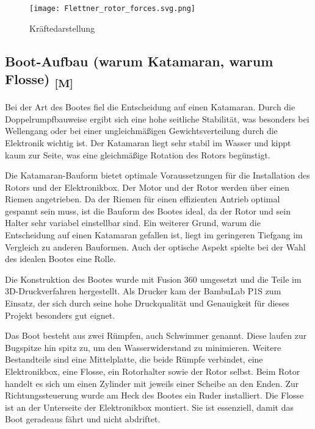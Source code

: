 \documentclass[a4paper,12pt]{article}
\begin{document}
\begin{figure}[H]
    \centering
    \texttt{[image: Flettner\_rotor\_forces.svg.png]}
    \caption{Kräftedarstellung \cite{Flettner_Rotor_Wiki}}
    \label{fig:Kräftedarstellung}
\end{figure}



\newpage


\subsection{\texorpdfstring{Boot-Aufbau (warum Katamaran, warum Flosse) \textsubscript{[M]}}{Boot-Aufbau (warum Katamaran, warum Flosse) [M]}}
\label{sec:Boot-Aufbau}

Bei der Art des Bootes fiel die Entscheidung auf einen Katamaran. Durch die Doppelrumpfbauweise ergibt sich eine hohe seitliche Stabilität, was besonders bei Wellengang oder bei einer ungleichmäßigen Gewichtsverteilung durch die Elektronik wichtig ist. Der Katamaran liegt sehr stabil im Wasser und kippt kaum zur Seite, was eine gleichmäßige Rotation des Rotors begünstigt.\newline

Die Katamaran-Bauform bietet optimale Voraussetzungen für die Installation des Rotors und der Elektronikbox. Der Motor und der Rotor werden über einen Riemen angetrieben. Da der Riemen für einen effizienten Antrieb optimal gespannt sein muss, ist die Bauform des Bootes ideal, da der Rotor und sein Halter sehr variabel einstellbar sind. Ein weiterer Grund, warum die Entscheidung auf einen Katamaran gefallen ist, liegt im geringeren Tiefgang im Vergleich zu anderen Bauformen. Auch der optische Aspekt spielte bei der Wahl des idealen Bootes eine Rolle.\newline

Die Konstruktion des Bootes wurde mit Fusion 360 umgesetzt und die Teile im 3D-Druckverfahren hergestellt. Als Drucker kam der BambuLab P1S zum Einsatz, der sich durch seine hohe Druckqualität und Genauigkeit für dieses Projekt besonders gut eignet.

Das Boot besteht aus zwei Rümpfen, auch Schwimmer genannt. Diese laufen zur Bugspitze hin spitz zu, um den Wasserwiderstand zu minimieren. Weitere Bestandteile sind eine Mittelplatte, die beide Rümpfe verbindet, eine Elektronikbox, eine Flosse, ein Rotorhalter sowie der Rotor selbst. Beim Rotor handelt es sich um einen Zylinder mit jeweils einer Scheibe an den Enden. Zur Richtungssteuerung wurde am Heck des Bootes ein Ruder installiert. Die Flosse ist an der Unterseite der Elektronikbox montiert. Sie ist essenziell, damit das Boot geradeaus fährt und nicht abdriftet.\newline
\end{document}

